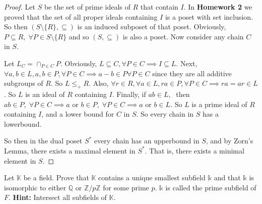 \documentclass[addpoints,10pt]{exam}
\theoremstyle{plain}
\theoremstyle{definition}
\newtheorem{prob}[thm]{Problem}
\theoremstyle{plain}
\theoremstyle{plain}
\theoremstyle{definition}
\let\oldprob\prob
\let\endoldprob\endprob
\renewenvironment{prob}
  {\begin{singlespace}\oldprob}
  {\endoldprob\end{singlespace}}
\newcommand{\KK}{\ensuremath{\mathbb{K}}}
\newcommand{\QQ}{\ensuremath{\mathbb{Q}}}
\newcommand{\ZZ}{\ensuremath{\mathbb{Z}}}
\newcommand{\kk}{\ensuremath{\mathds{k}}}
\newcommand{\tbf}[1]{\textbf{ #1 }}
\begin{document}
\begin{proof}
    Let $S$ be the set of prime ideals of $R$ that contain $I$. In \textbf{Homework 2} we proved that the set of all proper ideals containing $I$ is a poset with set inclusion. So then $(S\setminus \{R\},\subseteq)$ is an induced subposet of that poset. Obviously, $P\subseteq R,\;\forall P\in S\setminus\{R\}$ and so $(S,\subseteq)$ is also a poset. Now consider any chain $C$ in $S$.

    Let $L_{C}=\cap_{P\in C}P$. Obviously, $L\subseteq C,\forall P\in C\implies I\subseteq L$. Next, $\forall a,b\in L, a,b\in P,\forall P\in C\implies a-b\in P\forall P\in C$ since they are all additive subgroups of $R$. So $L\leq_{+}R$. Also, $\forall r\in R, \forall a\in L, ra\in P, \forall P\in C\implies ra=ar\in L$. So $L$ is an ideal of $R$ containing $I$. Finally, if $ab\in L,\;$ then $ab\in P,\;\forall P\in C\implies a\text{ or }b\in P,\;\forall P\in C\implies a\text{ or }b\in L$. So $L$ is a prime ideal of $R$ containing $I$, and a lower bound for $C$ in $S$. So every chain in $S$ has a lowerbound. 
    
    So then in the dual poset $S^{*}$ every chain has an upperbound in $S$, and by Zorn's Lemma, there exists a maximal element in $S^{*}$. That is, there exists a minimal element in $S$.
    
\end{proof}
\newpage
\begin{prob}
Let $\KK$ be a field. Prove that $\KK$ contains a unique smallest subfield $\kk$ and that $\kk$ is isomorphic to either $\QQ$ or $\ZZ/p\ZZ$ for some prime $p$. $\kk$ is called the prime subfield of $F$. \tbf{Hint:} Intersect all subfields of $\KK$.
\end{prob}
\end{document}
